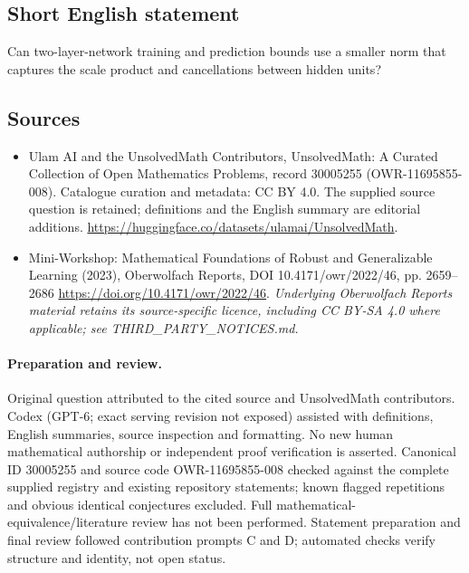 \documentclass[11pt]{article}
\begin{document}
\subsection{Short English statement}
Can two-layer-network training and prediction bounds use a smaller norm that captures the scale product and cancellations between hidden units?
\subsection{Sources}
\begin{itemize}
\item[\hypertarget{source:30005255:1}{S1}] Ulam AI and the UnsolvedMath Contributors, UnsolvedMath: A Curated Collection of Open Mathematics Problems, record 30005255 (OWR-11695855-008). Catalogue curation and metadata: CC BY 4.0. The supplied source question is retained; definitions and the English summary are editorial additions.
\url{https://huggingface.co/datasets/ulamai/UnsolvedMath}.
\item[\hypertarget{source:30005255:2}{S2}] Mini-Workshop: Mathematical Foundations of Robust and Generalizable Learning (2023), Oberwolfach Reports, DOI 10.4171/owr/2022/46, pp. 2659--2686
\url{https://doi.org/10.4171/owr/2022/46}.
\textit{Underlying Oberwolfach Reports material retains its source-specific licence, including CC BY-SA 4.0 where applicable; see THIRD\_PARTY\_NOTICES.md.}
\end{itemize}
\paragraph{Preparation and review.}
Original question attributed to the cited source and UnsolvedMath contributors. Codex (GPT-6; exact serving revision not exposed) assisted with definitions, English summaries, source inspection and formatting. No new human mathematical authorship or independent proof verification is asserted. Canonical ID 30005255 and source code OWR-11695855-008 checked against the complete supplied registry and existing repository statements; known flagged repetitions and obvious identical conjectures excluded. Full mathematical-equivalence/literature review has not been performed. Statement preparation and final review followed contribution prompts C and D; automated checks verify structure and identity, not open status.
\label{end:30005255}
\end{document}
